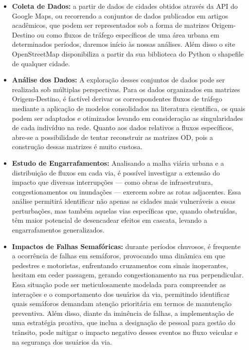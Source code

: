 \documentclass{article}
\begin{document}
\begin{itemize}
    \item \textbf{Coleta de Dados:} a partir de dados de cidades obtidos através da API do Google Maps, ou recorrendo a conjuntos de dados publicados em artigos acadêmicos, que podem ser representados sob a forma de matrizes Origem-Destino ou como fluxos de tráfego específicos de uma área urbana em determinados períodos, daremos início às nossas análises. Além disso o site OpenStreetMap disponibiliza a partir da sua biblioteca do Python o shapefile de qualquer cidade.
    \item \textbf{Análise dos Dados:} A exploração desses conjuntos de dados pode ser realizada sob múltiplas perspectivas. Para os dados organizados em matrizes Origem-Destino, é factível derivar os correspondentes fluxos de tráfego mediante a aplicação de modelos consolidados na literatura científica, os quais podem ser adaptados e otimizados levando em consideração as singularidades de cada indivíduo na rede. Quanto aos dados relativos a fluxos específicos, abre-se a possibilidade de tentar reconstruir as matrizes OD, pois a construção dessas matrizes é muito custosa.
    \item \textbf{Estudo de Engarrafamentos:}  Analisando a malha viária urbana e a distribuição de fluxos em cada via, é possível investigar a extensão do impacto que diversas interrupções — como obras de infraestrutura, congestionamentos ou inundações — exercem sobre as rotas adjacentes. Essa análise permitirá identificar não apenas as cidades mais vulneráveis a essas perturbações, mas também aquelas vias específicas que, quando obstruídas, têm maior potencial de desencadear efeitos em cascata, levando a engarrafamentos generalizados. 
    \item \textbf{Impactos de Falhas Semafóricas:} durante períodos chuvosos, é frequente a ocorrência de falhas em semáforos, provocando uma dinâmica em que pedestres e motoristas, enfrentando cruzamentos com sinais inoperantes, hesitam em ceder passagem, gerando congestionamento na rua perpendicular. Essa situação pode ser meticulosamente modelada para compreender as interações e o comportamento dos usuários da via, permitindo identificar quais semáforos demandam atenção prioritária em termos de manutenção preventiva. Além disso, diante da iminência de falhas, a implementação de uma estratégia proativa, que inclua a designação de pessoal para gestão do trânsito, pode mitigar o impacto negativo desses eventos no fluxo veicular e na segurança dos usuários da via.
\end{itemize}
\end{document}

